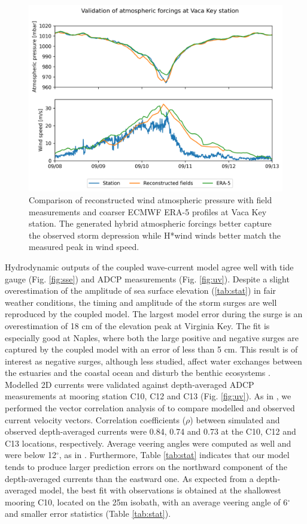 \documentclass[preprint,12pt,authoryear]{elsarticle}
\begin{document}
\begin{figure}
    \centering
    \includegraphics[width=.95\textwidth]{fig/validation_met_2.png}
    \caption{Comparison of reconstructed wind atmospheric pressure with field measurements and coarser ECMWF ERA-5 profiles at Vaca Key station. The generated hybrid atmospheric forcings better capture the observed storm depression while H*wind winds better match the measured peak in wind speed.}
    \label{fig:forcings}
\end{figure}

Hydrodynamic outputs of the coupled wave-current model agree well with tide gauge (Fig. \ref{fig:sse}) and ADCP measurements (Fig. \ref{fig:uv}). Despite a slight overestimation of the amplitude of sea surface elevation (\ref{tab:stat}) in fair weather conditions, the timing and amplitude of the storm surges are well reproduced by the coupled model. The largest model error during the surge is an overestimation of 18 cm of the elevation peak at Virginia Key. The fit is especially good at Naples, where both the large positive and negative surges are captured by the coupled model with an error of less than 5 cm. This result is of interest as negative surges, although less studied, affect water exchanges between the estuaries and the coastal ocean and disturb the benthic ecosystems \citep{liu2020impacts}. Modelled 2D currents were validated against depth-averaged ADCP measurements at mooring station C10, C12 and C13 (Fig. \ref{fig:uv}). As in \cite{liu2020impacts}, we performed the vector correlation analysis of \cite{kundu1976ekman} to compare modelled and observed current velocity vectors. Correlation coefficients ($\rho$) between simulated and observed depth-averaged currents were 0.84, 0.74 and 0.73 at the C10, C12 and C13 locations, respectively. Average veering angles were computed as well and were below 12$^\circ$, as in \citep{liu2020impacts}. Furthermore, Table \ref{tab:stat} indicates that our model tends to produce larger prediction errors on the northward component of the depth-averaged currents than the eastward one. As expected from a depth-averaged model, the best fit with observations is obtained at the shallowest mooring C10, located on the 25m isobath, with an average veering angle of 6$^\circ$ and smaller error statistics (Table \ref{tab:stat}). 
\end{document}
